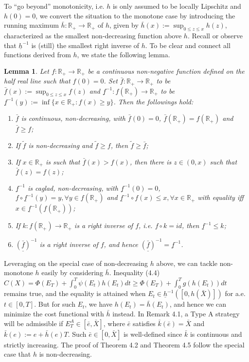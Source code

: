 \documentclass[openany,oneside]{article}
\newtheorem{lem}[thm]{Lemma}
\theoremstyle{definition}
\theoremstyle{remark}
\begin{document}
To ``go beyond'' monotonicity, i.e. $h$ is only assumed to be locally Lipschitz and $h(0)=0$, we convert the situation to the monotone case by introducing the running maximum $\bar{h}:\mathbb{R}_+ \to \mathbb{R}_+$ of $h$, given by $\bar{h}(x) := \sup_{0\le z\le x} h(z)$, characterized as the smallest non-decreasing function above $h$. Recall or observe that $\underline{h}^{-1}$ is (still) the smallest right inverse of $h$. To be clear and connect all functions derived from $h$, we state the following lemma.
\begin{lem}
Let $f:\mathbb{R}_+ \to \mathbb{R}_+$ be a continuous non-negative function defined on the half real line such that $f(0)=0$. Set $\bar{f}:\mathbb{R}_+ \to \mathbb{R}_+$ to be $\bar{f}(x) := \sup_{0\le z\le x} f(z)$ and $\underline{f}^{-1}:f(\mathbb{R}_+) \to \mathbb{R}_+$ to be $\underline{f}^{-1}(y) := \inf\{x\in\mathbb{R_+} : f(x) \ge y\}$. Then the followings hold:
\begin{enumerate}
\item $\bar{f}$ is continuous, non-decreasing, with $\bar{f}(0)=0$, $\bar{f}(\mathbb{R}_+)  = f(\mathbb{R}_+)$ and $\bar{f} \ge f$;
\item If $\tilde{f}$ is non-decreasing and $\tilde{f} \ge f$, then $\tilde{f} \ge \bar{f}$;
\item If $x\in \mathbb{R}_+$ is such that $\bar{f}(x) > f(x)$, then there is $z\in(0,x)$ such that $\bar{f}(z) = f(z)$;
\item $\underline{f}^{-1}$ is caglad, non-decreasing, with $\underline{f}^{-1}(0)=0$, $f\circ \underline{f}^{-1}(y) = y, \forall y\in f(\mathbb{R}_+)$ and $\underline{f}^{-1} \circ f (x) \le x, \forall x\in \mathbb{R}_+$ with equality iff $x\in \underline{f}^{-1}(f(\mathbb{R}_+))$;
\item If $k:f(\mathbb{R}_+) \to \mathbb{R}_+$ is a right inverse of $f$, i.e. $f\circ k = id$, then $\underline{f}^{-1} \le k$;
\item $\underline{\left(\bar{f}\right)}^{-1}$ is a right inverse of $f$, and hence $\underline{\left(\bar{f}\right)}^{-1} = \underline{f}^{-1}$.
\end{enumerate}
\end{lem}

Leveraging on the special case of non-decreasing $h$ above, we can tackle non-monotone $h$ easily by considering $\bar{h}$. Inequality (4.4) $C(X) = \Phi(E_T) + \int_0^T \psi(E_t) h(E_t) dt \ge \Phi(E_T) + \int_0^T g(h(E_t)) dt$ remains true, and the equality is attained when $E_t \in \underline{h}^{-1}([0,h(\bar{X})])$ for a.e. $t\in[0,T]$. But for such $E_t$, we have $h(E_t) = \bar{h}(E_t)$, and hence we can minimize the cost functional with $\bar{h}$ instead. In Remark 4.1, a Type A strategy will be admissible if $E^A_T \in[\bar{e},\bar{X}]$, where $\bar{e}$ satisfies $\bar{k}(\bar{e}) = \bar{X}$ and $\bar{k}(e) := e + \bar{h}(e) T$. Such $\bar{e} \in [0,\bar{X}]$ is well-defined since $\bar{k}$ is continuous and strictly increasing. The proof of Theorem 4.2 and Theorem 4.5 follow the special case that $h$ is non-decreasing.
\end{document}
